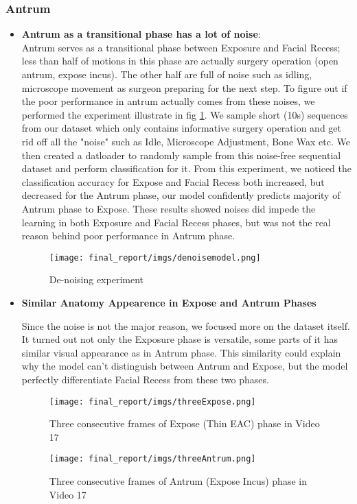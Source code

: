 \documentclass[11pt]{article} \usepackage[top=1in, bottom=1in, left=1in, right=1in]{geometry}
\begin{document}
\subsubsection{Antrum}
\begin{itemize}
    \item \textbf{Antrum as a transitional phase has a lot of noise}:\\
    Antrum serves as a transitional phase between Exposure and Facial Recess; less than half of motions in this phase are actually surgery operation (open antrum, expose incus). The other half are full of noise such as idling, microscope movement as surgeon preparing for the next step. To figure out if the poor performance in antrum actually comes from these noises, we performed the experiment illustrate in fig \ref{fig:denoise}. We sample short (10s) sequences from our dataset which only contains informative surgery operation and get rid off all the "noise" such as Idle, Microscope Adjustment, Bone Wax etc. We then created a datloader to randomly sample from this noise-free sequential dataset and perform classification for it. From this experiment, we noticed the classification accuracy for Expose and Facial Recess both increased, but decreased for the Antrum phase, our model confidently predicts majority of Antrum phase to Expose. These results showed noises did impede the learning in both Exposure and Facial Recess phases, but was not the real reason behind poor performance in Antrum phase. 
    \begin{figure}[H]
      \texttt{[image: final\_report/imgs/denoisemodel.png]}
      \centering
      \caption{De-noising experiment}
      \label{fig:denoise}
    \end{figure}
    
    \item \textbf{Similar Anatomy Appearence in Expose and Antrum Phases}
    
    Since the noise is not the major reason, we focused more on the dataset itself. It turned out not only the Exposure phase is versatile, some parts of it has similar visual appearance as in Antrum phase. This similarity could explain why the model can't distinguish between Antrum and Expose, but the model perfectly differentiate Facial Recess from these two phases. 
    \begin{figure}[H]
      \texttt{[image: final\_report/imgs/threeExpose.png]}
      \centering
      \caption{Three consecutive frames of Expose (Thin EAC) phase in Video 17}
      \label{fig:3framesExpose}
    \end{figure}
    \begin{figure}[H]
      \texttt{[image: final\_report/imgs/threeAntrum.png]}
      \centering
      \caption{Three consecutive frames of Antrum (Expose Incus) phase in Video 17}
      \label{fig:3framesAntrum}
    \end{figure}
    

\end{itemize}
\end{document}

